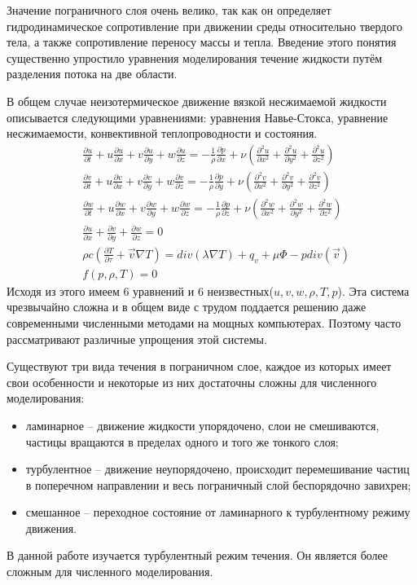 	Значение пограничного слоя очень велико, так как он определяет гидродинамическое сопротивление при движении среды относительно твердого тела, а также сопротивление переносу массы и тепла. Введение этого понятия существенно упростило уравнения моделирования течение жидкости путём разделения потока на две области.
	
	В общем случае неизотермическое движение вязкой несжимаемой жидкости описывается следующими уравнениями: уравнения Навье-Стокса, уравнение несжимаемости, конвективной теплопроводности и состояния.
	\begin{align}
		& \frac{\partial u}{\partial t} + u\frac{\partial u}{\partial x} + v\frac{\partial u}{\partial y} + w\frac{\partial u}{\partial z} = -\frac{1}{\rho}\frac{\partial p}{\partial x} + \nu(\frac{\partial^2 u}{\partial x^2} + \frac{\partial^2 u}{\partial y^2} + \frac{\partial^2 u}{\partial z^2}) \nonumber\\
		& \frac{\partial v}{\partial t} + u\frac{\partial v}{\partial x} + v\frac{\partial v}{\partial y} + w\frac{\partial v}{\partial z} = -\frac{1}{\rho}\frac{\partial p}{\partial y} + \nu(\frac{\partial^2 v}{\partial x^2} + \frac{\partial^2 v}{\partial y^2} + \frac{\partial^2 v}{\partial z^2})\nonumber\\
		& \frac{\partial w}{\partial t} + u\frac{\partial w}{\partial x} + v\frac{\partial w}{\partial y} + w\frac{\partial w}{\partial z} = -\frac{1}{\rho}\frac{\partial p}{\partial z} + \nu(\frac{\partial^2 w}{\partial x^2} + \frac{\partial^2 w}{\partial y^2} + \frac{\partial^2 w}{\partial z^2})\nonumber\\
		& \frac{\partial u}{\partial x} + \frac{\partial v}{\partial y} + \frac{\partial w}{\partial z} = 0 \nonumber\\
		& \rho c (\frac{\partial T}{\partial\tau} + \vec{v}\nabla T) = div(\lambda \nabla T) + q_v + \mu\Phi - p div(\vec{v}) \nonumber\\
		& f(p, \rho, T) = 0
	\end{align}
	Исходя из этого имеем 6 уравнений и 6 неизвестных($u, v, w, \rho, T, p$). Эта система чрезвычайно сложна и в общем виде с трудом поддается решению даже современными численными методами на мощных компьютерах. Поэтому часто рассматривают различные упрощения этой системы.
	
	Существуют три вида течения в пограничном слое, каждое из которых имеет свои особенности и некоторые из них достаточны сложны для численного моделирования:
	\begin{itemize}
		\item ламинарное -- движение жидкости упорядочено, слои не смешиваются, частицы вращаются в пределах одного и того же тонкого слоя;
		\item турбулентное -- движение неупорядочено, происходит перемешивание частиц в поперечном направлении и весь пограничный слой беспорядочно завихрен;
		\item смешанное -- переходное состояние от ламинарного к турбулентному режиму движения.
	\end{itemize}
	В данной работе изучается турбулентный режим течения. Он является более сложным для численного моделирования.
